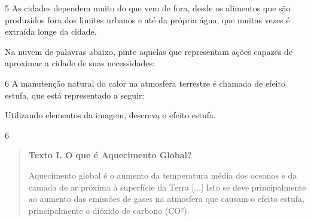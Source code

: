 \num{5} As cidades dependem muito do que vem de fora, desde os alimentos que
são produzidos fora dos limites urbanos e até da própria água, que
muitas vezes é extraída longe da cidade.

Na nuvem de palavras abaixo, pinte aquelas que representam ações capazes
de aproximar a cidade de suas necessidades:

\begin{multicols}{2}


\end{multicols}


\num{6} A manutenção natural do calor na atmosfera terrestre é chamada de
efeito estufa, que está representado a seguir:



Utilizando elementos da imagem, descreva o efeito estufa.

\linhas[2]


\num{6}

\begin{quote}
\textbf{Texto I. O que é Aquecimento Global?}

Aquecimento global é o aumento da temperatura média dos oceanos e
da camada de ar próxima à superfície da Terra {[}...{]} Isto se deve
principalmente ao aumento das emissões de gases na atmosfera que causam
o efeito estufa, principalmente o dióxido de carbono
(CO²).

\end{quote}

